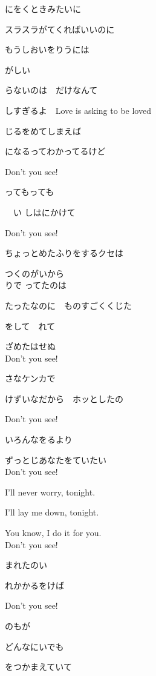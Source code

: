 \large{

にをくときみたいに

スラスラがてくればいいのに

もうしおいをりうには　

がしい

らないのは　だけなんて

しすぎるよ　Love is asking to be loved

じるをめてしまえば　

になるってわかってるけど

   

Don't you see!

ってもっても

　い  しはにかけて

Don't you see!　

ちょっとめたふりをするクセは

つくのがいから 
\\

りで  ってたのは

たったなのに　ものすごくくじた

をして　れて　

ざめたはせぬ
\\

Don't you see!　

さなケンカで

けずいなだから　ホッとしたの

Don't you see!

いろんなをるより

ずっとじあなたをていたい
\\

Don't you see!　

I'll never worry, tonight.

I'll lay me down, tonight.

You know, I do it for you.
\\

Don't you see!　

まれたのい

れかかるをけば

Don't you see!

のもが　

どんなにいでも

をつかまえていて

}